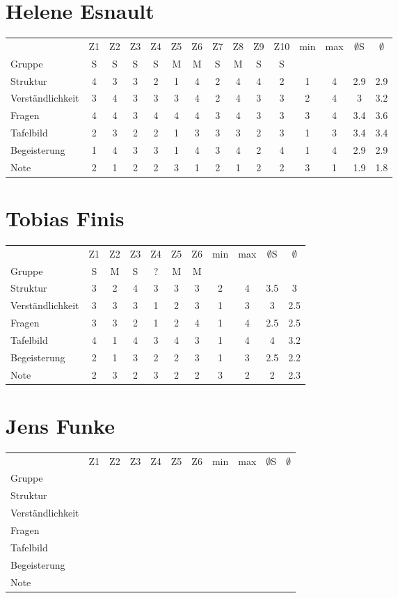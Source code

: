 \documentclass[a4paper]{article}
\begin{document}
\section{Helene Esnault}
\begin{tabular}{l|cccccccccc|cc|cc}
&Z1&Z2&Z3&Z4&Z5&Z6&Z7&Z8&Z9&Z10&min&max&$\emptyset$S&$\emptyset$\\
Gruppe               &S&S&S&S&M&M&S&M&S&S&&&&\\
\hline
Struktur             &4&3&3&2&1&4&2&4&4&2&1&4&2.9&2.9\\
Verst\"andlichkeit   &3&4&3&3&3&4&2&4&3&3&2&4&3&3.2\\
Fragen               &4&4&3&4&4&4&3&4&3&3&3&4&3.4&3.6\\
Tafelbild            &2&3&2&2&1&3&3&3&2&3&1&3&3.4&3.4\\
Begeisterung         &1&4&3&3&1&4&3&4&2&4&1&4&2.9&2.9\\
\hline
Note                 &2&1&2&2&3&1&2&1&2&2&3&1&1.9&1.8
\end{tabular}

\section{Tobias Finis}
\begin{tabular}{l|cccccc|cc|cc}
&Z1&Z2&Z3&Z4&Z5&Z6&min&max&$\emptyset$S&$\emptyset$\\
Gruppe               &S&M&S&?&M&M&&&&\\
\hline
Struktur             &3&2&4&3&3&3&2&4&3.5&3\\
Verst\"andlichkeit   &3&3&3&1&2&3&1&3&3&2.5\\
Fragen               &3&3&2&1&2&4&1&4&2.5&2.5\\
Tafelbild            &4&1&4&3&4&3&1&4&4&3.2\\
Begeisterung         &2&1&3&2&2&3&1&3&2.5&2.2\\
\hline
Note                 &2&3&2&3&2&2&3&2&2&2.3
\end{tabular}


\section{Jens Funke}
\begin{tabular}{l|cccccc|cc|cc}
&Z1&Z2&Z3&Z4&Z5&Z6&min&max&$\emptyset$S&$\emptyset$\\
Gruppe               &&&&&&&&&&\\
\hline
Struktur             &&&&&&&&&&\\
Verst\"andlichkeit   &&&&&&&&&&\\
Fragen               &&&&&&&&&&\\
Tafelbild            &&&&&&&&&&\\
Begeisterung         &&&&&&&&&&\\
\hline
Note                 &&&&&&&&&&
\end{tabular}
\end{document}
